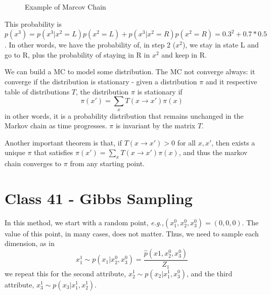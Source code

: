 \documentclass{article}
\newcommand{\eg}{\textit{e.g.,}}
\begin{document}
\begin{figure}
    \centering
    
    
    \caption{Example of Marcov Chain}
\end{figure}

This probability is $p(x^3) = p(x^3|x^2 = L)p(x^2 = L) + p(x^3|x^2 = R)p(x^2 = R) = 0.3^2 + 0.7*0.5$. In other words, we have the probability of, in step 2 ($x^2$), we stay in state L and go to R, plus the probability of staying in R in $x^2$ and keep in R.

We can build a MC to model some distribution. The MC not converge always: it converge if the distribution is stationary - given a distribution $\pi$ and it respective table of distributions $T$, the distribution $\pi$ is stationary if
\begin{equation}
    \pi(x') = \sum_x T(x \rightarrow x')\pi(x)
\end{equation}
in other words, it is a probability distribution that remains unchanged in the Markov chain as time progresses. $\pi$ is invariant by the matrix $T$.

Another important theorem is that, if $T(x \rightarrow x') > 0$ for all $x, x'$, then exists a unique $\pi$ that satisfies $\pi(x') = \sum_x T(x \rightarrow x')\pi(x)$, and thus the markov chain converges to $\pi$ from any starting point.

\section{Class 41 - Gibbs Sampling}
In this method, we start with a random point, \eg $(x_1^0, x_2^0, x_3^0) = (0, 0, 0)$. The value of this point, in many cases, does not matter. Thus, we need to sample each dimension, as in 
\begin{equation}
    x_1^1 \sim p(x_1| x_2^0, x_3^0) = \frac{\hat{p}(x1, x_2^0, x_3^0)}{Z_1}
\end{equation}
we repeat this for the second attribute, $x_2^1 \sim p(x_2| x_1^1, x_3^0)$, and the third attribute, $x_3^1 \sim p(x_3| x_1^1, x_2^1)$.
\end{document}
